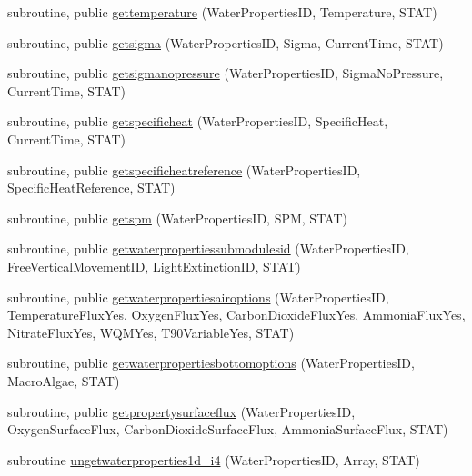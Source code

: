 \begin{DoxyCompactItemize}
\item 
subroutine, public \mbox{\hyperlink{namespacemodulewaterproperties_a98876d77f6e973aec7cd3341346e8d8b}{gettemperature}} (Water\+Properties\+ID, Temperature, S\+T\+AT)
\item 
subroutine, public \mbox{\hyperlink{namespacemodulewaterproperties_ae8ca73c7b0b0c01064b13ed994d0935c}{getsigma}} (Water\+Properties\+ID, Sigma, Current\+Time, S\+T\+AT)
\item 
subroutine, public \mbox{\hyperlink{namespacemodulewaterproperties_a900d2a5073201659f4476e350c5d728a}{getsigmanopressure}} (Water\+Properties\+ID, Sigma\+No\+Pressure, Current\+Time, S\+T\+AT)
\item 
subroutine, public \mbox{\hyperlink{namespacemodulewaterproperties_aa36e244423ac757e350a49437c3fb368}{getspecificheat}} (Water\+Properties\+ID, Specific\+Heat, Current\+Time, S\+T\+AT)
\item 
subroutine, public \mbox{\hyperlink{namespacemodulewaterproperties_af502ab70c7f5479a4e039154e3b7b099}{getspecificheatreference}} (Water\+Properties\+ID, Specific\+Heat\+Reference, S\+T\+AT)
\item 
subroutine, public \mbox{\hyperlink{namespacemodulewaterproperties_ae9ef33b9d5369265c98090b0520a41ae}{getspm}} (Water\+Properties\+ID, S\+PM, S\+T\+AT)
\item 
subroutine, public \mbox{\hyperlink{namespacemodulewaterproperties_aa92bc10cfb8ceb9e3edd659ae8e6ed71}{getwaterpropertiessubmodulesid}} (Water\+Properties\+ID, Free\+Vertical\+Movement\+ID, Light\+Extinction\+ID, S\+T\+AT)
\item 
subroutine, public \mbox{\hyperlink{namespacemodulewaterproperties_a01766661cdbaa08fdb84926b54369de4}{getwaterpropertiesairoptions}} (Water\+Properties\+ID, Temperature\+Flux\+Yes, Oxygen\+Flux\+Yes, Carbon\+Dioxide\+Flux\+Yes, Ammonia\+Flux\+Yes, Nitrate\+Flux\+Yes, W\+Q\+M\+Yes, T90\+Variable\+Yes, S\+T\+AT)
\item 
subroutine, public \mbox{\hyperlink{namespacemodulewaterproperties_a7c3194f050d1f1d1afd1dc2fd3e02dec}{getwaterpropertiesbottomoptions}} (Water\+Properties\+ID, Macro\+Algae, S\+T\+AT)
\item 
subroutine, public \mbox{\hyperlink{namespacemodulewaterproperties_af2c46d3b317e3d23dca87bea01a118fa}{getpropertysurfaceflux}} (Water\+Properties\+ID, Oxygen\+Surface\+Flux, Carbon\+Dioxide\+Surface\+Flux, Ammonia\+Surface\+Flux, S\+T\+AT)
\item 
subroutine \mbox{\hyperlink{namespacemodulewaterproperties_a595720f235e82fd22fab49105706b84e}{ungetwaterproperties1d\+\_\+i4}} (Water\+Properties\+ID, Array, S\+T\+AT)

\end{DoxyCompactItemize}
